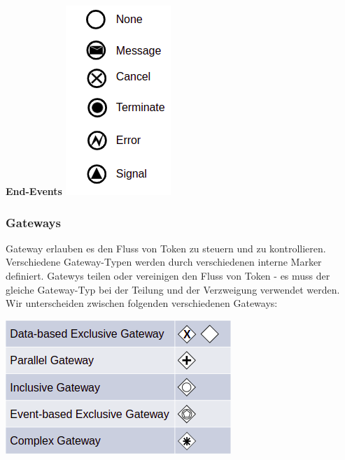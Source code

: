     \begin{minipage}[t]{0.3\textwidth}
    \centering
    \textbf{End-Events}
    \newline
	\includegraphics[width=0.55\linewidth]{images/BPMN_end-events.png}
    \end{minipage}
\subsubsection{Gateways}
Gateway erlauben es den Fluss von Token zu steuern und zu kontrollieren. Verschiedene Gateway-Typen werden durch verschiedenen interne Marker definiert. Gatewys teilen oder vereinigen den Fluss von Token - es muss der gleiche Gateway-Typ bei der Teilung und der Verzweigung verwendet werden.
Wir unterscheiden zwischen folgenden verschiedenen Gateways:\\


\begin{minipage}[t]{1\textwidth}
    \centering
	\includegraphics[width=0.6\linewidth]{images/BPMN_gateways-overview.png}
\end{minipage}


